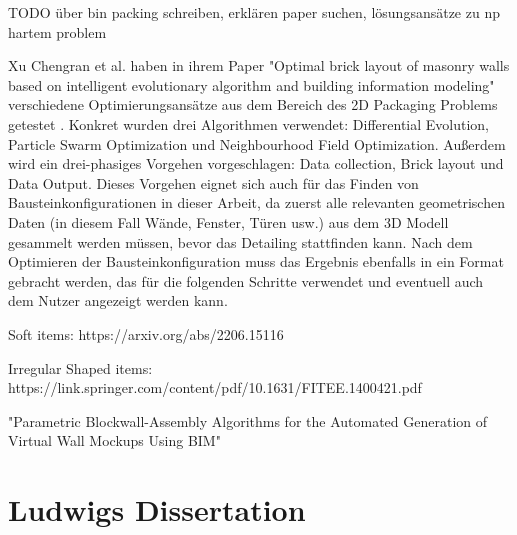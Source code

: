 TODO über bin packing schreiben, erklären paper suchen, lösungsansätze zu np hartem problem 

Xu Chengran et al. haben in ihrem Paper "Optimal brick layout of masonry walls based on intelligent evolutionary algorithm and building information modeling" verschiedene Optimierungsansätze aus dem Bereich des 2D Packaging Problems getestet \cite{Xu2021}.
Konkret wurden drei Algorithmen verwendet: Differential Evolution, Particle Swarm Optimization und Neighbourhood Field Optimization.
Außerdem wird ein drei-phasiges Vorgehen vorgeschlagen: Data collection, Brick layout und Data Output.
Dieses Vorgehen eignet sich auch für das Finden von Bausteinkonfigurationen in dieser Arbeit, da zuerst alle relevanten geometrischen Daten (in diesem Fall Wände, Fenster, Türen usw.) aus dem 3D Modell gesammelt werden müssen, bevor das Detailing stattfinden kann.
Nach dem Optimieren der Bausteinkonfiguration muss das Ergebnis ebenfalls in ein Format gebracht werden, das für die folgenden Schritte verwendet und eventuell auch dem Nutzer angezeigt werden kann.


Soft items: https://arxiv.org/abs/2206.15116

Irregular Shaped items: https://link.springer.com/content/pdf/10.1631/FITEE.1400421.pdf

"Parametric Blockwall-Assembly Algorithms for the Automated Generation of Virtual Wall Mockups Using BIM"
\section{Ludwigs Dissertation}
\label{related:ludwigs dis}



